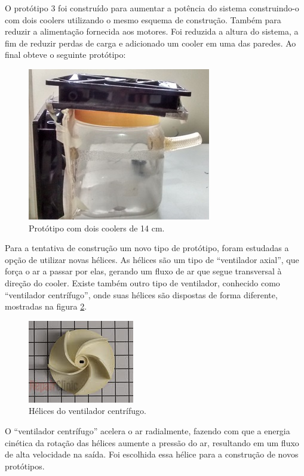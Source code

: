 		O protótipo 3 foi construído para aumentar a potência do sistema construindo-o com dois coolers utilizando o mesmo esquema de construção. Também para reduzir a alimentação fornecida aos motores. Foi reduzida a altura do sistema, a fim de reduzir perdas de carga e adicionado um cooler em uma das paredes. Ao final obteve o seguinte protótipo:

		\begin{figure}[H]
			\centering
			\includegraphics[scale=1]{figuras/asppc2_4.jpg}
			\caption{Protótipo com dois coolers de 14 cm.}
			\label{img:coolers_14cm}
		\end{figure}

		Para a tentativa de construção um novo tipo de protótipo, foram estudadas a opção de utilizar novas hélices. As hélices são um tipo de “ventilador axial”, que força o ar a passar por elas, gerando um fluxo de ar que segue transversal à direção do cooler. Existe também outro tipo de ventilador, conhecido como “ventilador centrífugo”, onde suas hélices são dispostas de forma diferente, mostradas na figura \ref{img:ventilador_centrífugo}.

		\begin{figure}[H]
			\centering
			\includegraphics[scale=1]{figuras/asppc2_5.jpg}
			\caption{Hélices do ventilador centrífugo.}
			\label{img:ventilador_centrífugo}
		\end{figure}

		O “ventilador centrífugo” acelera o ar radialmente, fazendo com que a energia cinética da rotação das hélices aumente a pressão do ar, resultando em um fluxo de alta velocidade na saída. Foi escolhida essa hélice para a construção de novos protótipos.

